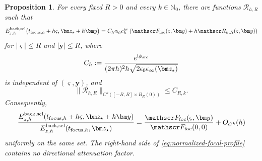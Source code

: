 \documentclass[11pt,reqno]{amsart}
\newtheorem{proposition}{Proposition}[section]
\newcommand{\ii}{\mathrm{i}}
\numberwithin{equation}{section}
\begin{document}
\begin{proposition}
For every fixed $R>0$ and every $k\in\mathbb N_0$, there are functions
$\mathscr R_{h,R}$ such that
\begin{equation}\label{eq:focal-expansion}
 \begin{aligned}
 E_{z,h}^{\rm back,sel}\bigl(t_{{\rm focus},h}+h\varsigma,\bm z_\star+h\bm y\bigr)
 =C_h\alpha_hc_h^{\rm av}\left(\mathscr F_{\rm foc}(\varsigma,\bm y)+h\mathscr R_{h,R}(\varsigma,\bm y)\right)
 \end{aligned}
\end{equation}
for $|\varsigma|\le R$ and $|\bm y|\le R$, where
\begin{equation}\label{eq:field-prefactor}
 C_h:=\frac{e^{\ii\phi_{\rm src}}}{(2\pi h)^2h\sqrt{2\epsilon_0\epsilon_\infty(\bm z_\star)}}
\end{equation}
is independent of $(\varsigma,\bm y)$, and
\begin{equation}\label{eq:focal-remainder-bound}
 \|\mathscr R_{h,R}\|_{C^k([-R,R]\times B_R(0))}\le C_{R,k}.
\end{equation}
Consequently,
\begin{equation}\label{eq:normalized-focal-profile}
 \frac{E_{z,h}^{\rm back,sel}(t_{{\rm focus},h}+h\varsigma,\bm z_\star+h\bm y)}{E_{z,h}^{\rm back,sel}(t_{{\rm focus},h},\bm z_\star)}
 =\frac{\mathscr F_{\rm foc}(\varsigma,\bm y)}{\mathscr F_{\rm foc}(0,0)}+O_{C^k}(h)
\end{equation}
uniformly on the same set. The right-hand side of
\eqref{eq:normalized-focal-profile} contains no directional attenuation factor.
\end{proposition}
\end{document}
